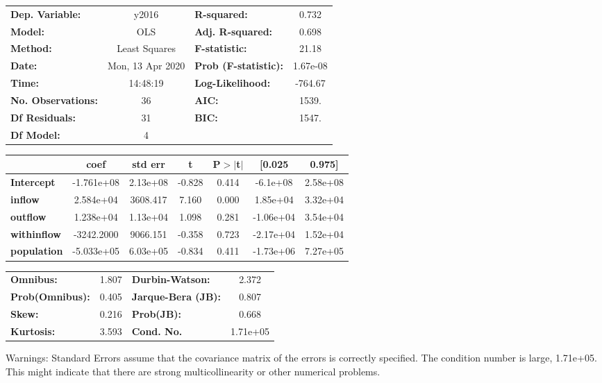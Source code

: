 \begin{center}
\begin{tabular}{lclc}
\toprule
\textbf{Dep. Variable:}    &      y2016       & \textbf{  R-squared:         } &     0.732   \\
\textbf{Model:}            &       OLS        & \textbf{  Adj. R-squared:    } &     0.698   \\
\textbf{Method:}           &  Least Squares   & \textbf{  F-statistic:       } &     21.18   \\
\textbf{Date:}             & Mon, 13 Apr 2020 & \textbf{  Prob (F-statistic):} &  1.67e-08   \\
\textbf{Time:}             &     14:48:19     & \textbf{  Log-Likelihood:    } &   -764.67   \\
\textbf{No. Observations:} &          36      & \textbf{  AIC:               } &     1539.   \\
\textbf{Df Residuals:}     &          31      & \textbf{  BIC:               } &     1547.   \\
\textbf{Df Model:}         &           4      & \textbf{                     } &             \\
\bottomrule
\end{tabular}
\begin{tabular}{lcccccc}
                    & \textbf{coef} & \textbf{std err} & \textbf{t} & \textbf{P$> |$t$|$} & \textbf{[0.025} & \textbf{0.975]}  \\
\midrule
\textbf{Intercept}  &   -1.761e+08  &     2.13e+08     &    -0.828  &         0.414        &     -6.1e+08    &     2.58e+08     \\
\textbf{inflow}     &    2.584e+04  &     3608.417     &     7.160  &         0.000        &     1.85e+04    &     3.32e+04     \\
\textbf{outflow}    &    1.238e+04  &     1.13e+04     &     1.098  &         0.281        &    -1.06e+04    &     3.54e+04     \\
\textbf{withinflow} &   -3242.2000  &     9066.151     &    -0.358  &         0.723        &    -2.17e+04    &     1.52e+04     \\
\textbf{population} &   -5.033e+05  &     6.03e+05     &    -0.834  &         0.411        &    -1.73e+06    &     7.27e+05     \\
\bottomrule
\end{tabular}
\begin{tabular}{lclc}
\textbf{Omnibus:}       &  1.807 & \textbf{  Durbin-Watson:     } &    2.372  \\
\textbf{Prob(Omnibus):} &  0.405 & \textbf{  Jarque-Bera (JB):  } &    0.807  \\
\textbf{Skew:}          &  0.216 & \textbf{  Prob(JB):          } &    0.668  \\
\textbf{Kurtosis:}      &  3.593 & \textbf{  Cond. No.          } & 1.71e+05  \\
\bottomrule
\end{tabular}
\end{center}

Warnings: \newline
 [1] Standard Errors assume that the covariance matrix of the errors is correctly specified. \newline
 [2] The condition number is large, 1.71e+05. This might indicate that there are \newline
 strong multicollinearity or other numerical problems.